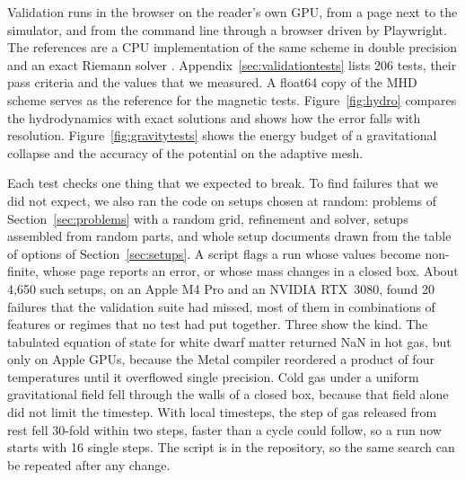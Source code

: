 \documentclass[twocolumn]{aastex701}
\begin{document}
Validation runs in the browser on the reader's own GPU, from a page next to the simulator, and from the command line through a browser driven by Playwright. The references are a CPU implementation of the same scheme in double precision and an exact Riemann solver \citep{Toro2009}. Appendix~\ref{sec:validationtests} lists 206 tests, their pass criteria and the values that we measured. A float64 copy of the MHD scheme serves as the reference for the magnetic tests. Figure~\ref{fig:hydro} compares the hydrodynamics with exact solutions and shows how the error falls with resolution. Figure~\ref{fig:gravitytests} shows the energy budget of a gravitational collapse and the accuracy of the potential on the adaptive mesh.

Each test checks one thing that we expected to break. To find failures that we did not expect, we also ran the code on setups chosen at random: problems of Section~\ref{sec:problems} with a random grid, refinement and solver, setups assembled from random parts, and whole setup documents drawn from the table of options of Section~\ref{sec:setups}. A script flags a run whose values become non-finite, whose page reports an error, or whose mass changes in a closed box. About 4,650 such setups, on an Apple M4 Pro and an NVIDIA RTX~3080, found 20 failures that the validation suite had missed, most of them in combinations of features or regimes that no test had put together. Three show the kind. The tabulated equation of state for white dwarf matter returned NaN in hot gas, but only on Apple GPUs, because the Metal compiler reordered a product of four temperatures until it overflowed single precision. Cold gas under a uniform gravitational field fell through the walls of a closed box, because that field alone did not limit the timestep. With local timesteps, the step of gas released from rest fell 30-fold within two steps, faster than a cycle could follow, so a run now starts with 16 single steps. The script is in the repository, so the same search can be repeated after any change.
\end{document}

